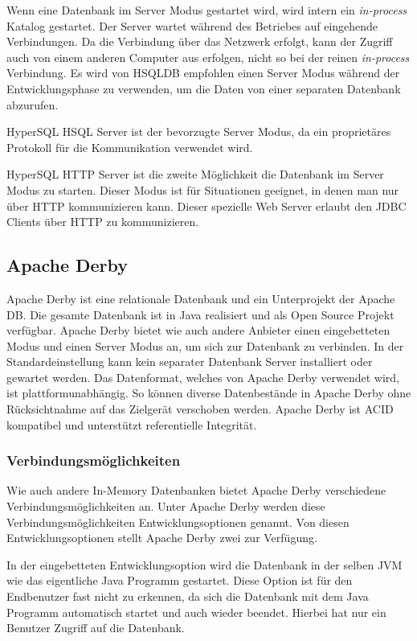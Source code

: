 \documentclass[draft,final]{vutinfth} %
\begin{document}
Wenn eine Datenbank im Server Modus gestartet wird, wird intern ein \textit{in-process} Katalog gestartet. Der Server wartet während des Betriebes auf eingehende Verbindungen. Da die Verbindung über das Netzwerk erfolgt, kann der Zugriff auch von einem anderen Computer aus erfolgen, nicht so bei der reinen \textit{in-process} Verbindung. Es wird von HSQLDB empfohlen einen Server Modus während der Entwicklungsphase zu verwenden, um die Daten von einer separaten Datenbank abzurufen.

HyperSQL HSQL Server ist der bevorzugte Server Modus, da ein proprietäres Protokoll für die Kommunikation verwendet wird.

HyperSQL HTTP Server ist die zweite Möglichkeit die Datenbank im Server Modus zu starten. Dieser Modus ist für Situationen geeignet, in denen man nur über HTTP kommunizieren kann. Dieser spezielle Web Server erlaubt den JDBC Clients über HTTP zu kommunizieren. 

\cite{HSQLGuide}

\subsection{Apache Derby}
Apache Derby ist eine relationale Datenbank und ein Unterprojekt der Apache DB. Die gesamte Datenbank ist in Java realisiert und als Open Source Projekt verfügbar. Apache Derby bietet wie auch andere Anbieter einen eingebetteten Modus und einen Server Modus an, um sich zur Datenbank zu verbinden. In der Standardeinstellung kann kein separater Datenbank Server installiert oder gewartet werden. Das Datenformat, welches von Apache Derby verwendet wird, ist plattformunabhängig. So können diverse Datenbestände in Apache Derby ohne Rücksichtnahme auf das Zielgerät verschoben werden. Apache Derby ist ACID kompatibel und unterstützt referentielle Integrität.

\subsubsection*{Verbindungsmöglichkeiten}
Wie auch andere In-Memory Datenbanken bietet Apache Derby verschiedene Verbindungsmöglichkeiten an. Unter Apache Derby werden diese Verbindungsmöglichkeiten Entwicklungsoptionen genannt. Von diesen Entwicklungsoptionen stellt Apache Derby zwei zur Verfügung. 

In der eingebetteten Entwicklungsoption wird die Datenbank in der selben JVM wie das eigentliche Java Programm gestartet. Diese Option ist für den Endbenutzer fast nicht zu erkennen, da sich die Datenbank mit dem Java Programm automatisch startet und auch wieder beendet. Hierbei hat nur ein Benutzer Zugriff auf die Datenbank.
\end{document}
